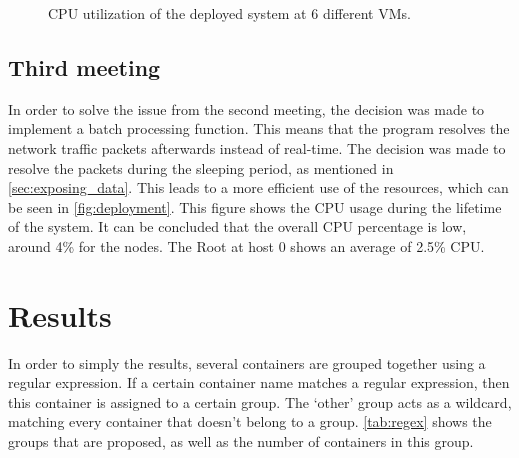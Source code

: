 \begin{figure}
    \caption{CPU utilization of the deployed system at 6 different VMs.}
    \label{fig:deployment}
\end{figure}

\subsection{Third meeting}
In order to solve the issue from the second meeting, the decision was made to implement a batch processing function. This means that the program resolves the network traffic packets afterwards instead of real-time. The decision was made to resolve the packets during the sleeping period, as mentioned in \autoref{sec:exposing_data}. This leads to a more efficient use of the resources, which can be seen in \autoref{fig:deployment}. This figure shows the CPU usage during the lifetime of the system. It can be concluded that the overall  CPU percentage is low, around 4\% for the nodes. The Root at host $0$ shows an average of 2.5\% CPU.

\section{Results}
In order to simply the results, several containers are grouped together using a regular expression. If a certain container name matches a regular expression, then this container is assigned to a certain group. The `other' group acts as a wildcard, matching every container that doesn't belong to a group. \autoref{tab:regex} shows the groups that are proposed, as well as the number of containers in this group.\\

